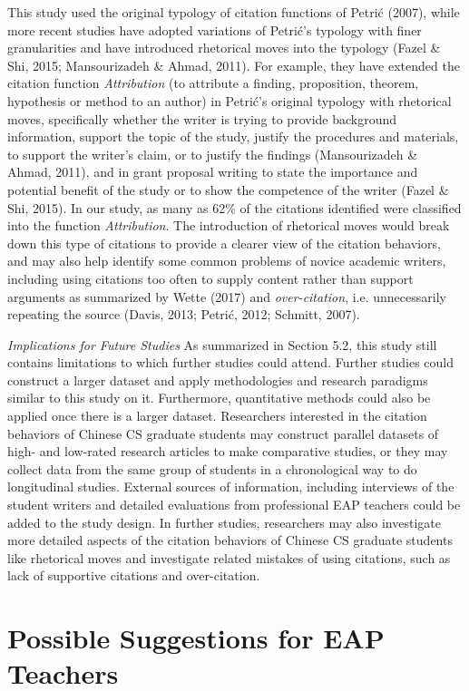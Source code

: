 This study used the original typology of citation functions of Petrić (2007), while more recent studies have adopted variations of Petrić’s typology with finer granularities and have introduced rhetorical moves into the typology (Fazel \& Shi, 2015; Mansourizadeh \& Ahmad, 2011). For example, they have extended the citation function \textit{Attribution} (to attribute a finding, proposition, theorem, hypothesis or method to an author) in Petrić’s original typology with rhetorical moves, specifically whether the writer is trying to provide background information, support the topic of the study, justify the procedures and materials, to support the writer’s claim, or to justify the findings (Mansourizadeh \& Ahmad, 2011), and in grant proposal writing to state the importance and potential benefit of the study or to show the competence of the writer (Fazel \& Shi, 2015). In our study, as many as 62\% of the citations identified were classified into the function \textit{Attribution}. The introduction of rhetorical moves would break down this type of citations to provide a clearer view of the citation behaviors, and may also help identify some common problems of novice academic writers, including using citations too often to supply content rather than support arguments as summarized by Wette (2017) and \textit{over-citation}, i.e. unnecessarily repeating the source (Davis, 2013; Petrić, 2012; Schmitt, 2007).

\textit{Implications for Future Studies}
As summarized in Section 5.2, this study still contains limitations to which further studies could attend. Further studies could construct a larger dataset and apply methodologies and research paradigms similar to this study on it. Furthermore, quantitative methods could also be applied once there is a larger dataset. Researchers interested in the citation behaviors of Chinese CS graduate students may construct parallel datasets of high- and low-rated research articles to make comparative studies, or they may collect data from the same group of students in a chronological way to do longitudinal studies. External sources of information, including interviews of the student writers and detailed evaluations from professional EAP teachers could be added to the study design. In further studies, researchers may also investigate more detailed aspects of the citation behaviors of Chinese CS graduate students like rhetorical moves and investigate related mistakes of using citations, such as lack of supportive citations and over-citation.

\section{Possible Suggestions for EAP Teachers}

